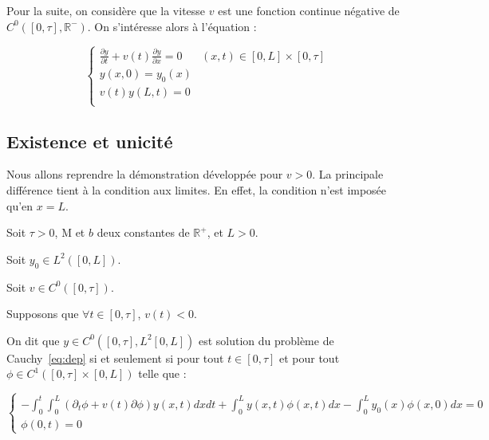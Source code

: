 \documentclass[a4paper]{article}
\newcommand{\mass}{\mathrm{M}}
\newcommand{\dep}{b}
\begin{document}
Pour la suite, on considère que la vitesse $v$ est une fonction continue négative de $C^0([0,\tau],\mathbb{R}^-)$.
On s'intéresse alors à l'équation :

\begin{equation}
		\label{eq:dep}
		\begin{cases}
			\displaystyle \frac{\partial y}{\partial t}+ v(t) \frac{\partial y} {\partial x}  = 0 & (x,t) \in [0,L] \times [0, \tau] \\
             y(x,0) = y_{0} (x) \\
			 v(t)y(L,t) = 0 \\
		\end{cases}
\end{equation}



\subsection{Existence et unicité}

Nous allons reprendre la démonstration développée pour $v>0$.
La principale différence tient à la condition aux limites.
En effet, la condition n'est imposée qu'en $x=L$.

\begin{definition}
	\label{def:cauchyd}
	Soit $\tau>0$, $\mass$ et $\dep$ deux constantes de $\mathbb{R}^+$, 
	et $L>0$. 
	
	Soit $y_0 \in L^2([0,L])$.
	
	Soit $v \in C^0([0,\tau])$.
	
	Supposons que $\forall t \in[0,\tau]$, $v(t)<0$.
	
	On dit que $y \in C^0([0,\tau],L^2[0,L])$ est solution du problème de Cauchy~\eqref{eq:dep}  
	si et seulement si pour tout $t \in [0,\tau]$ et pour
	tout $\phi \in C^1([0,\tau]\times [0,L])$ telle que :
	
	\begin{equation}
		\begin{cases}
			-\int_0^t \int_0^L (\partial_t \phi +v(t)\partial \phi) y(x,t) dxdt 
			+ \int_0^L y(x,t) \phi (x,t) dx - \int_0^L y_0(x)\phi(x,0)dx =0 \\
			\phi(0,t)=0
		\end{cases}
	\end{equation}
	
\end{definition}
\end{document}
